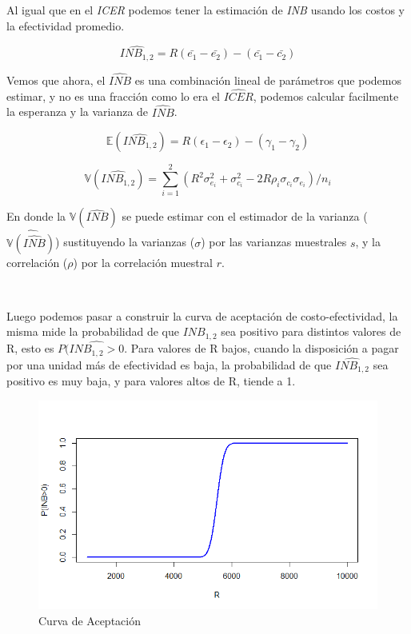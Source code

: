 \documentclass{article}
\begin{document}
Al igual que en el \textit{ICER} podemos tener la estimación de \textit{INB} usando los costos y la efectividad promedio.

\begin{equation}
    \widehat{INB_{1,2}} = R(\bar{e_{1}}-\bar{e_{2}})-(\bar{c_{1}}-\bar{c_{2}})
\end{equation}

Vemos que ahora, el $\widehat{INB}$ es una combinación lineal de parámetros que podemos estimar, y no es una fracción como lo era el $\widehat{ICER}$, podemos calcular facilmente la esperanza y la varianza de $\widehat{INB}$.

\begin{equation}
    \mathbb{E}(\widehat{INB_{1,2}})=R(\epsilon_1-\epsilon_2)-(\gamma_1-\gamma_2)
\end{equation}

\begin{equation}
    \mathbb{V}(\widehat{INB_{1,2}})=\sum_{i=1}^2(R^2\sigma^2_{e_i}+\sigma^2_{c_i}-2R\rho_i\sigma_{c_i}\sigma_{e_i})/n_i
\end{equation}

En donde la $\mathbb{V}(\widehat{INB})$ se puede estimar con el estimador de la varianza ($\widehat{\mathbb{V}(\widehat{INB})}$) sustituyendo la varianzas ($\sigma$) por las varianzas muestrales $s$, y la correlación ($\rho$) por la correlación muestral $r$.

\

Luego podemos pasar a construir la curva de aceptación de costo-efectividad, la misma mide la probabilidad de que $INB_{1,2}$ sea positivo para distintos valores de R, esto es $P(\widehat{INB_{1,2}>0}$. Para valores de R bajos, cuando la disposición a pagar por una unidad más de efectividad es baja, la probabilidad de que $\widehat{INB_{1,2}}$ sea positivo es muy baja, y para valores altos de R, tiende a 1.

\begin{figure}[htbp]
    \centering
    \includegraphics[width=1\textwidth]{grafi/Curva_acept.jpg}
    \caption{Curva de Aceptación}
    \label{fig:2}
\end{figure}
\end{document}
